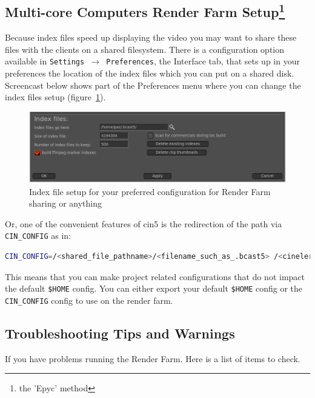 \subsection{Multi-core Computers Render Farm Setup\protect\footnote{the 'Epyc' method}}%
\label{sub:multi_core_render_farm_setup}

Because index files speed up displaying the video you may want to share these files with the clients on a shared filesystem.  There is a configuration option available in \texttt{Settings $\rightarrow$ Preferences}, the Interface tab, that sets up in your preferences the location of the index files which you can put on a shared disk.
Screencast below shows part of the Preferences menu where you can change the index files setup (figure~\ref{fig:index}).
\begin{figure}[htpb]
    \centering
    \includegraphics[width=0.8\linewidth]{images/index.png}
    \caption{Index file setup for your preferred configuration for Render Farm sharing or anything}
    \label{fig:index}
\end{figure}
 Or, one of the convenient features of cin5 is the redirection of the path via \texttt{CIN\_CONFIG} as in:
\begin{lstlisting}[language=bash]
CIN_CONFIG=/<shared_file_pathname>/<filename_such_as_.bcast5> /<cinelerra_pathname>/cin
\end{lstlisting}
This means that you can make project related configurations that do not impact the default \texttt{\$HOME} config.  You can either export your default \texttt{\$HOME} config or the \texttt{CIN\_CONFIG} config to use on the render farm.

\subsection{Troubleshooting Tips and Warnings}%
\label{sub:troubleshhoting_tips_warnings}

\noindent If you have problems running the Render Farm.  Here is a list of items to check.

